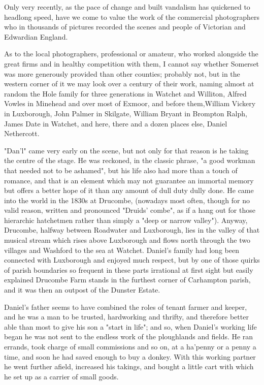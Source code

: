 
Only very recently, as the pace of change and built vandalism has quickened to headlong speed, have we come to value the work of the commercial photographers who in thousands of pictures recorded the scenes and people of Victorian and Edwardian England.

As to the local photographers, professional or amateur, who worked alongside the great firms and in healthy competition with them, I cannot say whether Somerset was more generously provided than other counties; probably not, but in the western corner of it we may look over a century of their work, naming almost at random the Hole family for three generations in Watchet and Williton, Alfred Vowles in Minehead and over most of Exmoor, and before them,William Vickery in Luxborough, John Palmer in Skilgate, William Bryant in Brompton Ralph, James Date in Watchet, and here, there and a dozen places else, Daniel Nethercott. 

"Dan'l" came very early on the scene, but not only for that reason is he taking the centre of the stage. He was reckoned, in the classic phrase, "a good workman that needed not to be ashamed", but his life also had more than a touch of romance, and that is an element which may not guarantee an immortal memory but offers a better hope of it than any amount of dull duty dully done. He came into the world in the 1830s at Drucombe, (nowadays most often, though for no valid reason, written and pronounced "Druids' combe", as if a hang out for those hierarchic hatchetmen rather than simply a "deep or narrow valley"). Anyway, Drucombe, halfway between Roadwater and Luxborough, lies in the valley of that musical stream which rises above Luxborough and flows north through the two villages and Washford to the sea at Watchet. Daniel's family had long been connected with Luxborough and enjoyed much respect, but by one of those quirks of parish boundaries so frequent in these parts   irrational at first sight but easily explained   Drucombe Farm stands in the furthest corner of Carhampton parish, and it was then an outpost of the Dunster Estate. 

Daniel's father seems to have combined the roles of tenant farmer and keeper, and he was a man to be trusted, hardworking and thrifty, and therefore better able than most to give his son a "start in life"; and so, when Daniel's working life began he was not sent to the endless work of the ploughlands and fields. He ran errands, took charge of small commissions and so on, at a ha'penny or a penny a time, and soon he had saved enough to buy a donkey. With this working partner he went further afield, increased his takings, and bought a little cart with which he set up as a carrier of small goods. 


